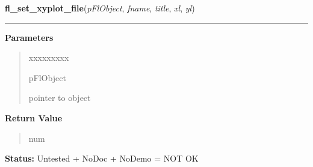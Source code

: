 \hspace{.8\funcindent}\begin{boxedminipage}{\funcwidth}

    \raggedright \textbf{fl\_set\_xyplot\_file}(\textit{pFlObject}, \textit{fname}, \textit{title}, \textit{xl}, \textit{yl})

    \vspace{-1.5ex}

    \rule{\textwidth}{0.5\fboxrule}
\setlength{\parskip}{2ex}
\setlength{\parskip}{1ex}
      \textbf{Parameters}
      \vspace{-1ex}

      \begin{quote}
        \begin{Ventry}{xxxxxxxxx}

          \item[pFlObject]

          pointer to object

        \end{Ventry}

      \end{quote}

      \textbf{Return Value}
    \vspace{-1ex}

      \begin{quote}
      num

      \end{quote}

\textbf{Status:} Untested + NoDoc + NoDemo = NOT OK



    \end{boxedminipage}

    \label{xformslib:flxyplot:fl_insert_xyplot_data}

    \vspace{0.5ex}

